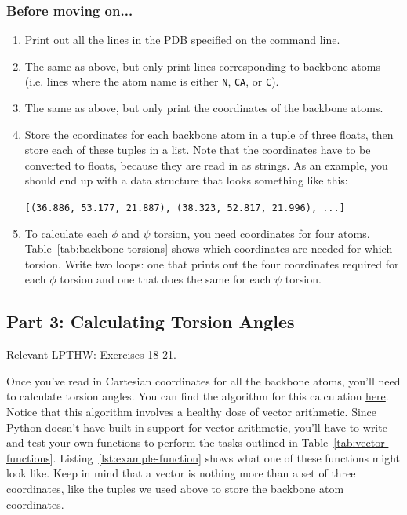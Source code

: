 \documentclass{article}
\newcommand{\bbphi}{\ensuremath{\phi}}
\newcommand{\bbpsi}{\ensuremath{\psi}}
\newenvironment{lpthw}
{Relevant LPTHW:}
{}
\newenvironment{problems}
{\subsubsection{Before moving on...} \begin{enumerate}}
{\end{enumerate}}
\begin{document}
\begin{problems}
 \item Print out all the lines in the PDB specified on the command line.

 \item The same as above, but only print lines corresponding to backbone atoms 
  (i.e. lines where the atom name is either \texttt{N}, \texttt{CA}, or 
  \texttt{C}).

 \item The same as above, but only print the coordinates of the backbone atoms.

 \item Store the coordinates for each backbone atom in a tuple of three floats, 
  then store each of these tuples in a list.  Note that the coordinates have to 
  be converted to floats, because they are read in as strings.  As an example, 
  you should end up with a data structure that looks something like this: 

  \texttt{[(36.886, 53.177, 21.887), (38.323, 52.817, 21.996), ...]}

 \item To calculate each \bbphi{} and \bbpsi{} torsion, you need coordinates 
  for four atoms.  Table~\ref{tab:backbone-torsions} shows which coordinates 
  are needed for which torsion.  Write two loops: one that prints out the four 
  coordinates required for each \bbphi{} torsion and one that does the same for 
  each \bbpsi{} torsion.
\end{problems}

\subsection{Part 3: Calculating Torsion Angles}

\begin{lpthw}
Exercises 18-21.
\end{lpthw}

Once you've read in Cartesian coordinates for all the backbone atoms, you'll 
need to calculate torsion angles.  You can find the algorithm for this 
calculation 
\href{http://math.stackexchange.com/questions/47059/how-do-i-calculate-a-dihedral-angle-given-cartesian-coordinates}{here}.  
Notice that this algorithm involves a healthy dose of vector arithmetic.  Since 
Python doesn't have built-in support for vector arithmetic, you'll have to 
write and test your own functions to perform the tasks outlined in 
Table~\ref{tab:vector-functions}.  Listing~\ref{lst:example-function} shows 
what one of these functions might look like.  Keep in mind that a vector is 
nothing more than a set of three coordinates, like the tuples we used above to 
store the backbone atom coordinates.  
\end{document}
